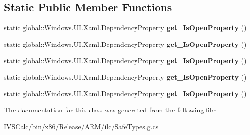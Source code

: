 \subsection*{Static Public Member Functions}
\begin{DoxyCompactItemize}
\item 
\mbox{\label{class_windows_1_1_u_i_1_1_xaml_1_1_controls_1_1_primitives_1_1_popup_a432bbbe863345afd70e2f4de493a86d9}} 
static global\+::\+Windows.\+U\+I.\+Xaml.\+Dependency\+Property {\bfseries get\+\_\+\+Is\+Open\+Property} ()
\item 
\mbox{\label{class_windows_1_1_u_i_1_1_xaml_1_1_controls_1_1_primitives_1_1_popup_a432bbbe863345afd70e2f4de493a86d9}} 
static global\+::\+Windows.\+U\+I.\+Xaml.\+Dependency\+Property {\bfseries get\+\_\+\+Is\+Open\+Property} ()
\item 
\mbox{\label{class_windows_1_1_u_i_1_1_xaml_1_1_controls_1_1_primitives_1_1_popup_a432bbbe863345afd70e2f4de493a86d9}} 
static global\+::\+Windows.\+U\+I.\+Xaml.\+Dependency\+Property {\bfseries get\+\_\+\+Is\+Open\+Property} ()
\item 
\mbox{\label{class_windows_1_1_u_i_1_1_xaml_1_1_controls_1_1_primitives_1_1_popup_a432bbbe863345afd70e2f4de493a86d9}} 
static global\+::\+Windows.\+U\+I.\+Xaml.\+Dependency\+Property {\bfseries get\+\_\+\+Is\+Open\+Property} ()
\item 
\mbox{\label{class_windows_1_1_u_i_1_1_xaml_1_1_controls_1_1_primitives_1_1_popup_a432bbbe863345afd70e2f4de493a86d9}} 
static global\+::\+Windows.\+U\+I.\+Xaml.\+Dependency\+Property {\bfseries get\+\_\+\+Is\+Open\+Property} ()
\end{DoxyCompactItemize}


The documentation for this class was generated from the following file\+:\begin{DoxyCompactItemize}
\item 
I\+V\+S\+Calc/bin/x86/\+Release/\+A\+R\+M/ilc/Safe\+Types.\+g.\+cs\end{DoxyCompactItemize}
